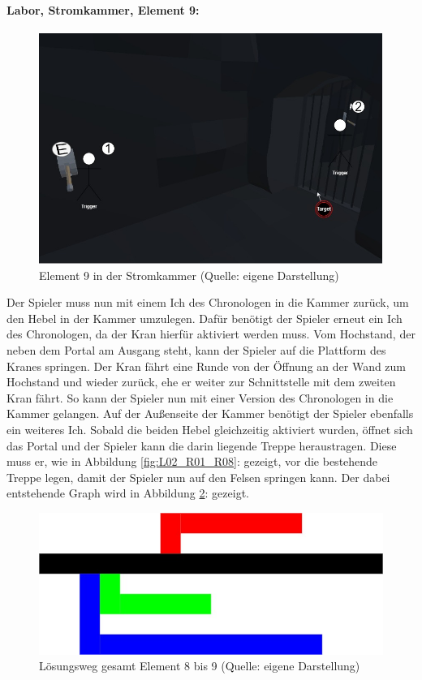 \paragraph{Labor, Stromkammer, Element 9:}\label{p:lse9}

\begin{figure}[ht]
\centering
\includegraphics[width=0.8\linewidth]{content/pictures/Raetsel-L02_R01_R10.jpg}
\caption{Element 9 in der Stromkammer (Quelle: eigene Darstellung)}
\label{fig:L02_R01_R10}
\end{figure}

Der Spieler muss nun mit einem Ich des Chronologen in die Kammer zurück, um den Hebel in der Kammer umzulegen. Dafür benötigt der Spieler erneut ein Ich des Chronologen, da der Kran hierfür aktiviert werden muss. Vom Hochstand, der neben dem Portal am Ausgang steht, kann der Spieler auf die Plattform des Kranes springen. Der Kran fährt eine Runde von der Öffnung an der Wand zum Hochstand und wieder zurück, ehe er weiter zur Schnittstelle mit dem zweiten Kran fährt. So kann der Spieler nun mit einer  Version des Chronologen in die Kammer gelangen. Auf der Außenseite der Kammer benötigt der Spieler ebenfalls ein weiteres Ich. Sobald die beiden Hebel gleichzeitig aktiviert wurden, öffnet sich das Portal und der Spieler kann die darin liegende Treppe heraustragen. Diese muss er, wie in Abbildung \ref{fig:L02_R01_R08}:  gezeigt, vor die bestehende Treppe legen, damit der Spieler nun auf den Felsen springen kann. Der dabei entstehende Graph wird in Abbildung \ref{fig:L02_E08_9_V01}:  gezeigt.

\begin{figure}[ht]
\centering
\includegraphics[width=1\linewidth]{content/pictures/Raetsel-L02_E08_9_V01_Loesung.jpg}
\caption{Lösungsweg gesamt Element 8 bis 9 (Quelle: eigene Darstellung)}
\label{fig:L02_E08_9_V01}
\end{figure}

